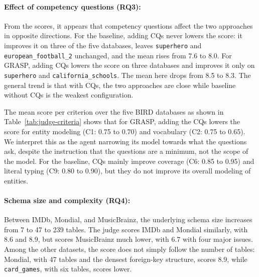 \paragraph{Effect of competency questions (RQ3):}
From the scores, it appears that competency questions affect the two approaches in opposite directions. For the baseline, adding CQs never lowers the score: it improves it on three of the five databases, leaves \texttt{superhero} and \texttt{european\_football\_2} unchanged, and the mean rises from 7.6 to 8.0. For GRASP, adding CQs lowers the score on three databases and improves it only on \texttt{superhero} and \texttt{california\_schools}. The mean here drops from 8.5 to 8.3. The general trend is that with CQs, the two approaches are close while baseline without CQs is the weakest configuration. 

The mean score per criterion over the five BIRD databases as shown in Table~\ref{tab:judge-criteria} shows that for GRASP, adding the CQs lowers the score for entity modeling (C1: 0.75 to 0.70) and vocabulary (C2: 0.75 to 0.65). We interpret this as the agent narrowing its model towards what the questions ask, despite the instruction that the questions are a minimum, not the scope of the model. For the baseline, CQs mainly improve coverage (C6: 0.85 to 0.95) and literal typing (C9: 0.80 to 0.90), but they do not improve its overall modeling of entities.


\paragraph{Schema size and complexity (RQ4):}
Between IMDb, Mondial, and MusicBrainz, the underlying schema size increases from 7 to 47 to 239 tables. The judge scores IMDb and Mondial similarly, with 8.6 and 8.9, but scores MusicBrainz much lower, with 6.7 with four major issues. Among the other datasets, the score does not simply follow the number of tables: Mondial, with 47 tables and the densest foreign-key structure, scores 8.9, while \texttt{card\_games}, with six tables, scores lower. 

